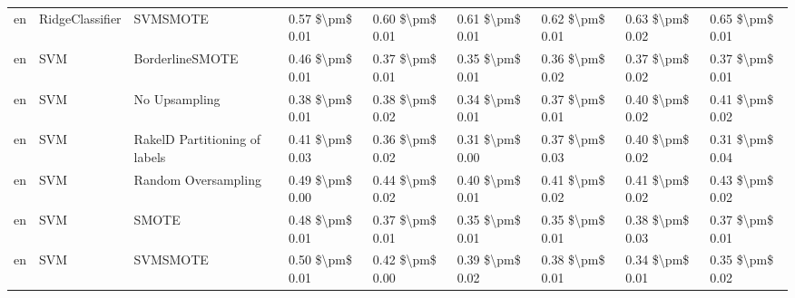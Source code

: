 \begin{tabular}{lllllllll}
      en &                 RidgeClassifier &                      SVMSMOTE & 0.57 \$\textbackslash pm\$ 0.01 &           0.60 \$\textbackslash pm\$ 0.01 &       0.61 \$\textbackslash pm\$ 0.01 &        0.62 \$\textbackslash pm\$ 0.01 &                         0.63 \$\textbackslash pm\$ 0.02 &     0.65 \$\textbackslash pm\$ 0.01 \\
      en &                             SVM &               BorderlineSMOTE & 0.46 \$\textbackslash pm\$ 0.01 &           0.37 \$\textbackslash pm\$ 0.01 &       0.35 \$\textbackslash pm\$ 0.01 &        0.36 \$\textbackslash pm\$ 0.02 &                         0.37 \$\textbackslash pm\$ 0.02 &     0.37 \$\textbackslash pm\$ 0.01 \\
      en &                             SVM &                 No Upsampling & 0.38 \$\textbackslash pm\$ 0.01 &           0.38 \$\textbackslash pm\$ 0.02 &       0.34 \$\textbackslash pm\$ 0.01 &        0.37 \$\textbackslash pm\$ 0.01 &                         0.40 \$\textbackslash pm\$ 0.02 &     0.41 \$\textbackslash pm\$ 0.02 \\
      en &                             SVM & RakelD Partitioning of labels & 0.41 \$\textbackslash pm\$ 0.03 &           0.36 \$\textbackslash pm\$ 0.02 &       0.31 \$\textbackslash pm\$ 0.00 &        0.37 \$\textbackslash pm\$ 0.03 &                         0.40 \$\textbackslash pm\$ 0.02 &     0.31 \$\textbackslash pm\$ 0.04 \\
      en &                             SVM &           Random Oversampling & 0.49 \$\textbackslash pm\$ 0.00 &           0.44 \$\textbackslash pm\$ 0.02 &       0.40 \$\textbackslash pm\$ 0.01 &        0.41 \$\textbackslash pm\$ 0.02 &                         0.41 \$\textbackslash pm\$ 0.02 &     0.43 \$\textbackslash pm\$ 0.02 \\
      en &                             SVM &                         SMOTE & 0.48 \$\textbackslash pm\$ 0.01 &           0.37 \$\textbackslash pm\$ 0.01 &       0.35 \$\textbackslash pm\$ 0.01 &        0.35 \$\textbackslash pm\$ 0.01 &                         0.38 \$\textbackslash pm\$ 0.03 &     0.37 \$\textbackslash pm\$ 0.01 \\
      en &                             SVM &                      SVMSMOTE & 0.50 \$\textbackslash pm\$ 0.01 &           0.42 \$\textbackslash pm\$ 0.00 &       0.39 \$\textbackslash pm\$ 0.02 &        0.38 \$\textbackslash pm\$ 0.01 &                         0.34 \$\textbackslash pm\$ 0.01 &     0.35 \$\textbackslash pm\$ 0.02 \\

\end{tabular}
